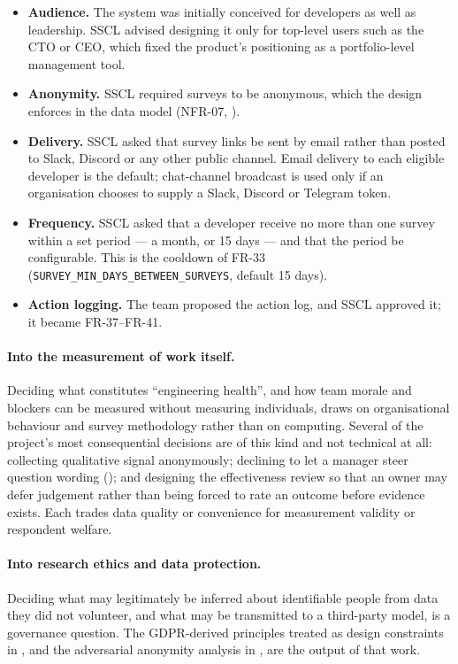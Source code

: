 \begin{itemize}
  \item \textbf{Audience.} The system was initially conceived for developers as
  well as leadership. SSCL advised designing it only for top-level users such as
  the CTO or CEO, which fixed the product's positioning as a portfolio-level
  management tool.
  \item \textbf{Anonymity.} SSCL required surveys to be anonymous, which the
  design enforces in the data model (NFR-07, ).
  \item \textbf{Delivery.} SSCL asked that survey links be sent by email rather
  than posted to Slack, Discord or any other public channel. Email delivery to
  each eligible developer is the default; chat-channel broadcast is used only if
  an organisation chooses to supply a Slack, Discord or Telegram token.
  \item \textbf{Frequency.} SSCL asked that a developer receive no more than one
  survey within a set period --- a month, or 15 days --- and that the period be
  configurable. This is the cooldown of FR-33
  (\texttt{SURVEY\_MIN\_DAYS\_BETWEEN\_SURVEYS}, default 15 days).
  \item \textbf{Action logging.} The team proposed the action log, and SSCL
  approved it; it became FR-37--FR-41.
\end{itemize}

\paragraph{Into the measurement of work itself.} Deciding what constitutes
``engineering health'', and how team morale and blockers can be measured without
measuring individuals, draws on organisational behaviour and survey methodology
rather than on computing. Several of the project's most consequential decisions
are of this kind and not technical at all: collecting qualitative signal
anonymously; declining to let a manager steer question wording
(); and designing the effectiveness review so
that an owner may defer judgement rather than being forced to rate an outcome
before evidence exists. Each trades data quality or convenience for measurement
validity or respondent welfare.

\paragraph{Into research ethics and data protection.} Deciding what may
legitimately be inferred about identifiable people from data they did not
volunteer, and what may be transmitted to a third-party model, is a governance
question. The GDPR-derived principles treated as design constraints in
, and the adversarial anonymity analysis in
, are the output of that work.

